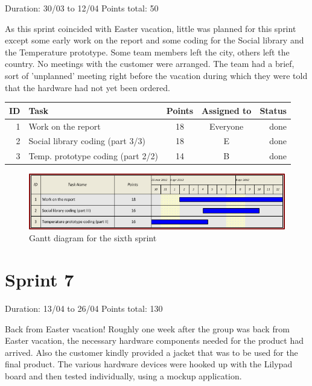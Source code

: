 Duration: 30/03 to 12/04\newline
Points total: 50

As this sprint coincided with Easter vacation, little was planned for this
sprint except some early work on the report and some coding for the Social
library and the Temperature prototype. Some team members left the city, others
left the country. No meetings with the customer were arranged. The team had a
brief, sort of 'unplanned' meeting right before the vacation during which they
were told that the hardware had not yet been ordered.

\begin{table}[ht!]
\begin{tabular}{ | r | l | c | c | r | }

\hline
\textbf{ID} & \textbf{Task} & \textbf{Points} & \textbf{Assigned to} & \textbf{Status} \\
\hline

1 & Work on the report						& 18 & Everyone & done \\
\hline
2 & Social library coding (part 3/3)		& 18 & E		& done \\
\hline
3 & Temp. prototype coding (part 2/2)		& 14 & B		& done \\
\hline

\end{tabular}
\end{table}

\begin{figure}[h!]
\centering \includegraphics[scale=0.8]{img/sprints-gantt6.png}
\caption{Gantt diagram for the sixth sprint}
\label{fig:sprints-gantt6}
\end{figure}

\newpage

\section{Sprint 7}

Duration: 13/04 to 26/04\newline
Points total: 130

Back from Easter vacation! Roughly one week after the group was back from
Easter vacation, the necessary hardware components needed for the product had
arrived. Also the customer kindly provided a jacket that was to be
used for the final product. The various hardware devices were hooked up with the
Lilypad board and then tested individually, using a mockup application.

